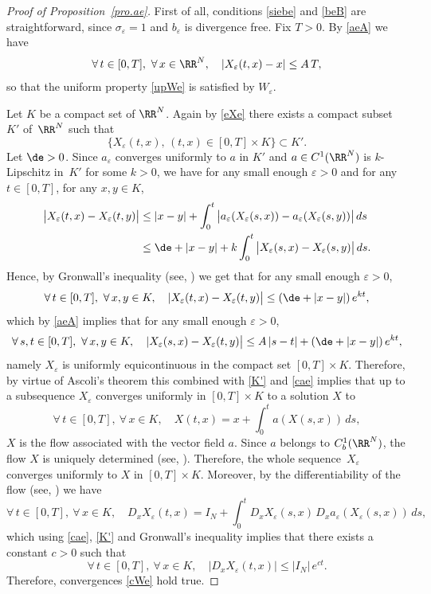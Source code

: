 \begin{proof}[Proof of Proposition~\ref{pro.ae}]
First of all, conditions \eqref{siebe} and \eqref{beB} are straightforward, since $\sigma_\varepsilon=1$ and $b_\varepsilon$ is divergence free.
Fix $T>0$. By \eqref{aeA} we have
\begin{equation}\label{eXe}
\forall\,t\in[0,T],\ \forall\,x\in\RR^N,\quad |X_\varepsilon(t,x)-x|\leq A\,T,
\end{equation}
so that the uniform property \eqref{upWe} is satisfied by $W_\varepsilon$.

Let $K$ be a compact set of $\RR^N$. Again by \eqref{eXe} there exists a compact subset $K'$ of~$\RR^N$ such that
\begin{equation}\label{K'}
\big\{X_\varepsilon(t,x),\,(t,x)\in[0,T]\times K\big\}\subset K'.
\end{equation}
Let $\de>0$. Since $a_\varepsilon$ converges uniformly to $a$ in $K'$ and $a\in C^1(\RR^N)$ is $k$-Lipschitz in~$K'$ for some $k>0$, we have for any small enough $\varepsilon>0$ and for any $t\in[0,T]$, for any $x,y\in K$,
\begin{align*}
\big|X_\varepsilon(t,x)-X_\varepsilon(t,y)\big| & \leq |x-y|+\int_0^t \big|a_\varepsilon(X_\varepsilon(s,x))-a_\varepsilon(X_\varepsilon(s,y))\big|\,ds
\\
& \leq \de+|x-y|+k\int_0^t\big|X_\varepsilon(s,x)-X_\varepsilon(s,y)\big|\,ds.
\end{align*}
Hence, by Gronwall's inequality (see, \eg \cite[\S 17.3]{HSD}) we get that for any small enough $\varepsilon>0$,
\[
\forall\,t\in[0,T],\ \forall\,x,y\in K,\quad |X_\varepsilon(t,x)-X_\varepsilon(t,y)\big|\leq(\de+|x-y|)\,e^{kt},
\]
which by \eqref{aeA} implies that for any small enough $\varepsilon>0$,
\[
\forall\,s,t\in[0,T],\ \forall\,x,y\in K,\quad |X_\varepsilon(s,x)-X_\varepsilon(t,y)\big|\leq A\,|s-t|+(\de+|x-y|)\,e^{kt},
\]
namely $X_\varepsilon$ is uniformly equicontinuous in the compact set $[0,T]\times K$. Therefore, by virtue of Ascoli's theorem this combined with \eqref{K'} and \eqref{cae} implies that up to a subsequence $X_\varepsilon$ converges uniformly in $[0,T]\times K$ to a solution $X$ to
\[
\forall\,t\in[0,T],\ \forall\,x\in K,\quad X(t,x)=x+\int_0^t a(X(s,x))\,ds,
\]
\ie $X$ is the flow associated with the vector field $a$. Since $a$ belongs to $C^1_b(\RR^N)$, the flow $X$ is uniquely determined (see, \eg \cite[\S 17.4]{HSD}).
Therefore, the whole sequence~$X_\varepsilon$ converges uniformly to $X$ in $[0,T]\times K$.
Moreover, by the differentiability of the flow (see, \eg \cite[\S 17.6]{HSD}) we have
\begin{equation}\label{DX}
\forall\,t\in[0,T],\ \forall\,x\in K,\quad D_xX_\varepsilon(t,x)=I_N+\int_0^t D_x X_\varepsilon(s,x)\,D_x a_\varepsilon(X_\varepsilon(s,x))\,ds,
\end{equation}
which using \eqref{cae}, \eqref{K'} and Gronwall's inequality implies that there exists a constant $c>0$ such that
\[
\forall\,t\in[0,T],\ \forall\,x\in K,\quad |D_x X_\varepsilon(t,x)|\leq |I_N|\,e^{ct}.
\]
Therefore, convergences \eqref{cWe} hold true.


\end{proof}
